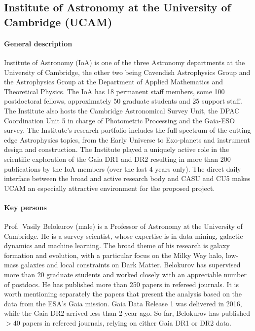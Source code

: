 \subsection{Institute of Astronomy at the University of Cambridge (UCAM)}
\label{sec:ucam}

\paragraph{General description}

Institute of Astronomy (IoA) is one of the three Astronomy departments at the University of Cambridge, the other two being Cavendish Astrophysics Group and the Astrophysics Group at the Department of Applied Mathematics and Theoretical Physics. The IoA has 18 permanent staff members, some 100 postdoctoral fellows, approximately 50 graduate students and 25 support staff. The Institute also hosts the Cambridge Astronomical Survey Unit, the DPAC Coordination Unit 5 in charge of Photometric Processing and the Gaia-ESO survey. The Institute’s research portfolio includes the full spectrum of the cutting edge Astrophysics topics, from the Early Universe to Exo-planets and instrument design and construction. The Institute played a uniquely active role in the scientific exploration of the Gaia DR1 and DR2 resulting in more than 200 publications by the IoA members (over the last 4 years only). The direct daily interface between the broad and active research body and CASU and CU5 makes UCAM an especially attractive environment for the proposed project.


\paragraph{Key persons}

Prof.~Vasily Belokurov (male) is a Professor of Astronomy at the University of Cambridge. He is a survey scientist, whose expertise is in data mining, galactic dynamics and machine learning. The broad theme of his research is galaxy formation and evolution, with a particular focus on the Milky Way halo, low-mass galaxies and local constraints on Dark Matter. Belokurov has supervised more than 20 graduate students and worked closely with an appreciable number of postdocs. He has published more than 250 papers in refereed journals. It is worth mentioning separately the papers that present the analysis based on the data from the ESA’s Gaia mission. Gaia Data Release 1 was delivered in 2016, while the Gaia DR2 arrived less than 2 year ago. So far, Belokurov has published $>$40 papers in refereed journals, relying on either Gaia DR1 or DR2 data.

